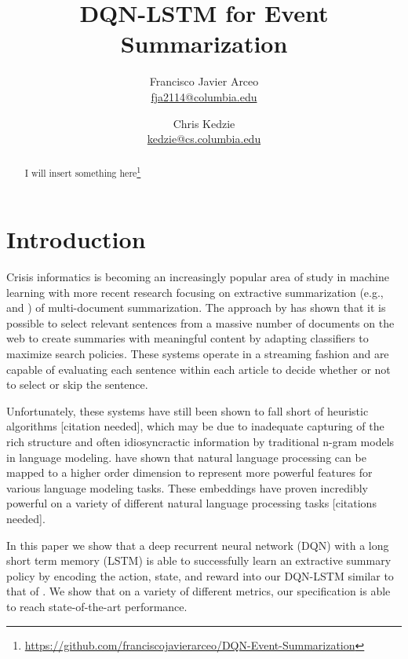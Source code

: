 \documentclass[12pt]{article}
\title{DQN-LSTM for Event Summarization }
\author{
	Francisco Javier Arceo \\ \href{mailto: fja2114@columbia.edu}{\small fja2114@columbia.edu} 
		\and  
	Chris Kedzie \\ \href{mailto: kedzie@cs.columbia.edu}{\small kedzie@cs.columbia.edu} 
	}
\begin{document}
\maketitle

\begin{abstract}
I will insert something here\footnote{ \url{https://github.com/franciscojavierarceo/DQN-Event-Summarization} }
\end{abstract}




\section{Introduction}

Crisis informatics is becoming an increasingly popular area of study in machine learning with more recent research focusing on extractive summarization (e.g., \cite{kedzie2015predicting} and \cite{kedzieextractive}) of multi-document summarization. The approach by \cite{kedzie2015predicting}  has shown that it is possible to select relevant sentences from a massive number of documents on the web to create summaries with meaningful content by adapting classifiers to maximize search policies. These systems operate in a streaming fashion and are capable of evaluating each sentence within each article to decide whether or not to select or skip the sentence. 

Unfortunately, these systems have still been shown to fall short of heuristic algorithms [citation needed], which may be due to inadequate capturing of the rich structure and often idiosyncractic information by traditional n-gram models  in language modeling. \cite{bengio2003neural} have shown that natural language processing can be mapped to a higher order dimension to represent more powerful features for various language modeling tasks. These embeddings have proven incredibly powerful on a variety of different natural language processing tasks [citations needed].

In this paper we show that a deep recurrent neural network (DQN) with a long short term memory (LSTM) is able to successfully learn an extractive summary policy by encoding the action, state, and reward into our DQN-LSTM similar to that of  \cite{hausknecht2015deep}. We show that on a variety of different metrics, our specification is able to reach state-of-the-art performance.
\end{document}
